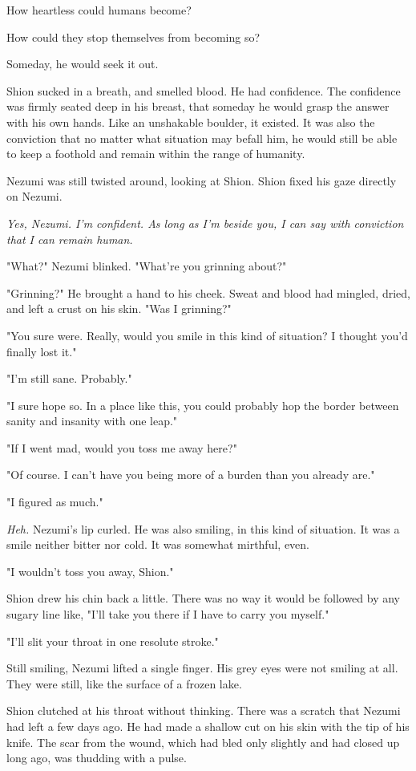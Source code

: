 How heartless could humans become?

How could they stop themselves from becoming so?

Someday, he would seek it out.

Shion sucked in a breath, and smelled blood. He had confidence. The
confidence was firmly seated deep in his breast, that someday he would
grasp the answer with his own hands. Like an unshakable boulder, it
existed. It was also the conviction that no matter what situation may
befall him, he would still be able to keep a foothold and remain within
the range of humanity.

Nezumi was still twisted around, looking at Shion. Shion fixed his gaze
directly on Nezumi.

\emph{Yes, Nezumi. I'm confident. As long as I'm beside you, I can say with
conviction that I can remain human.}

"What?" Nezumi blinked. "What're you grinning about?"

"Grinning?" He brought a hand to his cheek. Sweat and blood had mingled,
dried, and left a crust on his skin. "Was I grinning?"

"You sure were. Really, would you smile in this kind of situation? I
thought you'd finally lost it."

"I'm still sane. Probably."

"I sure hope so. In a place like this, you could probably hop the border
between sanity and insanity with one leap."

"If I went mad, would you toss me away here?"

"Of course. I can't have you being more of a burden than you already
are."

"I figured as much."

\emph{Heh.} Nezumi's lip curled. He was also smiling, in this kind of
situation. It was a smile neither bitter nor cold. It was somewhat
mirthful, even.

"I wouldn't toss you away, Shion."

Shion drew his chin back a little. There was no way it would be followed
by any sugary line like, "I'll take you there if I have to carry you
myself."

"I'll slit your throat in one resolute stroke."

Still smiling, Nezumi lifted a single finger. His grey eyes were not
smiling at all. They were still, like the surface of a frozen lake.

Shion clutched at his throat without thinking. There was a scratch that
Nezumi had left a few days ago. He had made a shallow cut on his skin
with the tip of his knife. The scar from the wound, which had bled only
slightly and had closed up long ago, was thudding with a pulse.

